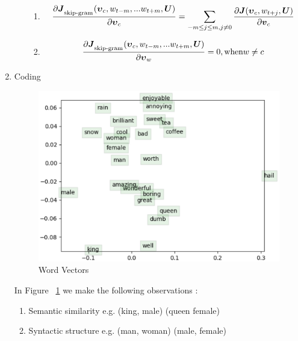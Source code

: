 \documentclass[]{article}
\begin{document}
\begin{enumerate}
\begin{enumerate}
\begin{enumerate}
      \item
	
		\begin{equation}	
		\frac{\partial 		\boldsymbol{J}_\textsubscript{skip-gram}(\boldsymbol{\upsilon}_c, w_{t-m},... w_{t+m}, \boldsymbol{U})}{\partial \boldsymbol{\upsilon}_{c}} = 
				\sum_{-m \leq j \leq m, j \neq 0} \frac{\partial 		\boldsymbol{J}(\boldsymbol{\upsilon}_c, w_{t+j}, \boldsymbol{U})}{\partial \boldsymbol{v}_{c}}
		\end{equation}	
			
			\item 
		
		\begin{equation}	
		\frac{\partial 		\boldsymbol{J}_\textsubscript{skip-gram}(\boldsymbol{\upsilon}_c, w_{t-m},... w_{t+m}, \boldsymbol{U})}{\partial \boldsymbol{\upsilon}_{w}} = 0, 
		\text{when} w \neq c
		\end{equation}
			
    \end{enumerate}
  
	\end{enumerate}

	\item Coding
	
	\begin{figure}
    \centering
    \includegraphics{word_vectors}
    \caption{Word Vectors}
    \label{fig:word_vectors}
	\end{figure}
	
	In Figure ~\ref{fig:word_vectors} we make the following observations :
	\begin{enumerate}
	\item Semantic similarity e.g. (king, male)  (queen female)
	\item Syntactic structure e.g. (man, woman)  (male, female)
	\end{enumerate}
	
\end{enumerate}
\end{document}
